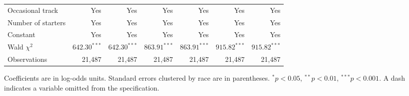 \begin{table}[!htbp]
\begin{tabular*}{\linewidth}{@{\extracolsep{\fill}}lrrrrrr@{}}
Occasional track & Yes & Yes & Yes & Yes & Yes & Yes \\
Number of starters & Yes & Yes & Yes & Yes & Yes & Yes \\
Constant & Yes & Yes & Yes & Yes & Yes & Yes \\
Wald $\chi^2$ & $642.30^{***}$ & $642.30^{***}$ & $863.91^{***}$ & $863.91^{***}$ & $915.82^{***}$ & $915.82^{***}$ \\
Observations & 21,487 & 21,487 & 21,487 & 21,487 & 21,487 & 21,487 \\
\bottomrule
\end{tabular*}
\par\vspace{4pt}\begin{minipage}{\linewidth}\footnotesize
Coefficients are in log-odds units. Standard errors clustered by race are in parentheses.
$^{*}p<0.05$, $^{**}p<0.01$, $^{***}p<0.001$. A dash indicates a variable omitted from the specification.
\end{minipage}
\end{table}
